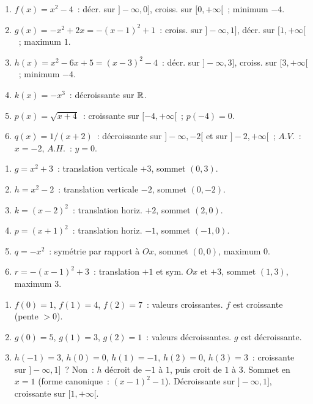 
\begin{enumerate}
  \item $f(x)=x^2-4$~: d\'ecr. sur $]-\infty,0]$, croiss. sur $[0,+\infty[$~; minimum $-4$.
  \item $g(x)=-x^2+2x=-(x-1)^2+1$~: croiss. sur $]-\infty,1]$, d\'ecr. sur $[1,+\infty[$~; maximum $1$.
  \item $h(x)=x^2-6x+5=(x-3)^2-4$~: d\'ecr. sur $]-\infty,3]$, croiss. sur $[3,+\infty[$~; minimum $-4$.
  \item $k(x)=-x^3$~: d\'ecroissante sur $\mathbb{R}$.
  \item $p(x)=\sqrt{x+4}$~: croissante sur $[-4,+\infty[$~; $p(-4)=0$.
  \item $q(x)=1/(x+2)$~: d\'ecroissante sur $]-\infty,-2[$ et sur $]-2,+\infty[$~; $A.V.$~: $x=-2$, $A.H.$~: $y=0$.
\end{enumerate}


\begin{enumerate}
  \item $g=x^2+3$~: translation verticale $+3$, sommet $(0,3)$.
  \item $h=x^2-2$~: translation verticale $-2$, sommet $(0,-2)$.
  \item $k=(x-2)^2$~: translation horiz. $+2$, sommet $(2,0)$.
  \item $p=(x+1)^2$~: translation horiz. $-1$, sommet $(-1,0)$.
  \item $q=-x^2$~: sym\'etrie par rapport \`a $Ox$, sommet $(0,0)$, maximum $0$.
  \item $r=-(x-1)^2+3$~: translation $+1$ et sym. $Ox$ et $+3$, sommet $(1,3)$, maximum $3$.
\end{enumerate}


\begin{enumerate}
  \item $f(0)=1$, $f(1)=4$, $f(2)=7$~: valeurs croissantes. $f$ est croissante (pente $>0$).\checkmark
  \item $g(0)=5$, $g(1)=3$, $g(2)=1$~: valeurs d\'ecroissantes. $g$ est d\'ecroissante.\checkmark
  \item $h(-1)=3$, $h(0)=0$, $h(1)=-1$, $h(2)=0$, $h(3)=3$~:
        croissante sur $]-\infty,1]$~? Non~: $h$ d\'ecroit de $-1$ \`a $1$, puis croit de $1$ \`a $3$.
        Sommet en $x=1$ (forme canonique~: $(x-1)^2-1$).
        D\'ecroissante sur $]-\infty,1]$, croissante sur $[1,+\infty[$.
\end{enumerate}

